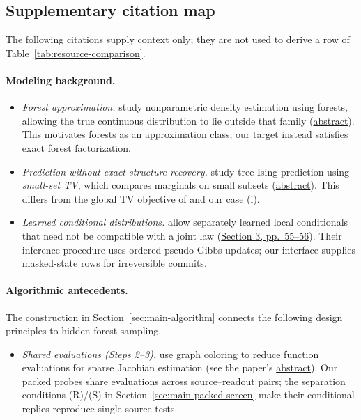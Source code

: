 \subsection{Supplementary citation map}
\label{app:related-work-supplement}

The following citations supply context only; they are not used to derive a row
of Table~\ref{tab:resource-comparison}.

{\color{red}
\paragraph{Modeling background.}
\begin{itemize}
\item \emph{Forest approximation.}
\citet{liu2011forestdensity} study nonparametric density estimation using
forests, allowing the true continuous distribution to lie outside that
family (\href{https://jmlr.org/papers/v12/liu11a.html}{abstract}).
This motivates forests as an approximation class; our target instead
satisfies exact forest factorization.

\item \emph{Prediction without exact structure recovery.}
\citet{bresler2020predictions} study tree Ising prediction using
\emph{small-set TV}, which compares marginals on small subsets
(\href{https://arxiv.org/abs/1604.06749}{abstract}).
This differs from the global TV objective of
\citet{daskalakis2021treeising} and our case (i).

\item \emph{Learned conditional distributions.}
\citet{heckerman2000dependency} allow separately learned local conditionals
that need not be compatible with a joint law
(\href{https://www.jmlr.org/papers/volume1/heckerman00a/heckerman00a.pdf\#page=7}{Section 3,
pp.~55--56}). Their inference procedure uses ordered pseudo-Gibbs updates;
our interface supplies masked-state rows for irreversible commits.
\end{itemize}

\paragraph{Algorithmic antecedents.}
\label{app:algorithmic-antecedents}
The construction in Section~\ref{sec:main-algorithm} connects the following
design principles to hidden-forest sampling.
\begin{itemize}
\item \emph{Shared evaluations (Steps 2--3).}
\citet{coleman1983estimation} use graph coloring to reduce function
evaluations for sparse Jacobian estimation (see the paper's
\href{https://epubs.siam.org/doi/10.1137/0720013}{abstract}).
Our packed probes share evaluations across source--readout pairs;
the separation conditions (R)/(S) in Section~\ref{sec:main-packed-screen}
make their conditional replies reproduce single-source tests.


\end{itemize}}

